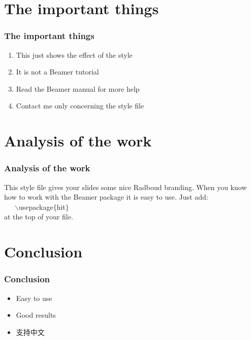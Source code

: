 \documentclass{beamer}
\begin{document}
\begin{CJK}{UTF8}{gbsn}
\section{The important things}

\begin{frame}
  \frametitle{The important things}

  \begin{enumerate}
    \item This just shows the effect of the style
    \item It is not a Beamer tutorial
    \item Read the Beamer manual for more help
    \item Contact me only concerning the style file
  \end{enumerate}
\end{frame}

\section{Analysis of the work}

\begin{frame}
  \frametitle{Analysis of the work}

  This style file gives your slides some nice Radboud branding.
  When you know how to work with the Beamer package it is easy to use.
  Just add:\\ ~~~$\backslash$usepackage$\{$hit$\}$ \\ at the top of your file.
\end{frame}

\section{Conclusion}

\begin{frame}
  \frametitle{Conclusion}

  \begin{itemize}
    \item Easy to use
    \item Good results
    \item 支持中文
  \end{itemize}
   
\end{frame}

 
\end{CJK}
\end{document}
